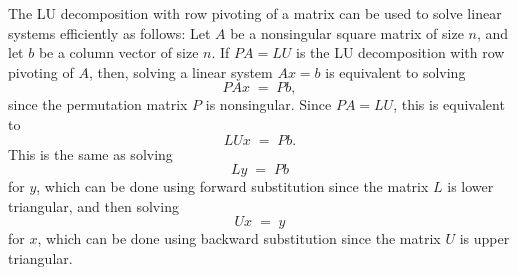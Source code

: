 The LU decomposition with row pivoting of a matrix can be used to solve
linear systems efficiently as follows: Let $A$ be a nonsingular square
matrix of size $n$, and let $b$ be a column vector of size $n$. If $PA=LU$
is the LU decomposition with row pivoting of $A$, then, solving a linear
system $Ax=b$ is equivalent to solving
\[
PAx \;=\; Pb,
\]
since the permutation matrix $P$ is nonsingular. Since $PA=LU$, this is
equivalent to
\[
LUx \;=\; Pb.
\]
This is the same as solving
\[
Ly \;=\; Pb
\]
for $y$, which can be done using forward substitution since the matrix $L$
is lower triangular, and then solving
\[
Ux \;=\; y
\]
for $x$, which can be done using backward substitution since the matrix $U$
is upper triangular.
